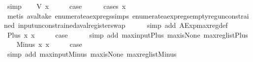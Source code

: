 \begin{isabellebody}
\ simp\isanewline
{}\isamarkupfalse%
\isanewline
\ \ \isamarkupfalse%
\ {\isacharparenleft}V\ x{\isacharparenright}\isanewline
\ \ \isamarkupfalse%
\ \isamarkupfalse%
\ {\isacharquery}case\isanewline
\ \ \ \ \isamarkupfalse%
\ {\isacharparenleft}cases\ x{\isacharparenright}\isanewline
\ \ \ \ \ \isamarkupfalse%
\ {\isacharparenleft}metis\ aval{\isacharunderscore}take\ enumerate{\isacharunderscore}aexp{\isacharunderscore}regs{\isachardot}simps{\isacharparenleft}{}{\isacharparenright}\ enumerate{\isacharunderscore}aexp{\isacharunderscore}regs{\isacharunderscore}empty{\isacharunderscore}reg{\isacharunderscore}unconstrained\ input{\isacharunderscore}unconstrained{\isacharunderscore}aval{\isacharunderscore}register{\isacharunderscore}swap{\isacharparenright}\isanewline
\ \ \ \ \isamarkupfalse%
\ {\isacharparenleft}simp\ add{\isacharcolon}\ AExp{\isachardot}max{\isacharunderscore}reg{\isacharunderscore}def{\isacharparenright}\isanewline
{}\isamarkupfalse%
\isanewline
\ \ \isamarkupfalse%
\ {\isacharparenleft}Plus\ x{}\ x{}{\isacharparenright}\isanewline
\ \ \isamarkupfalse%
\ \isamarkupfalse%
\ {\isacharquery}case\isanewline
\ \ \ \ \isamarkupfalse%
\ {\isacharparenleft}simp\ add{\isacharcolon}\ max{\isacharunderscore}input{\isacharunderscore}Plus\ max{\isacharunderscore}is{\isacharunderscore}None\ max{\isacharunderscore}reg{\isacharunderscore}list{\isacharunderscore}Plus{\isacharparenright}\isanewline
{}\isamarkupfalse%
\isanewline
\ \ \isamarkupfalse%
\ {\isacharparenleft}Minus\ x{}\ x{}{\isacharparenright}\isanewline
\ \ \isamarkupfalse%
\ \isamarkupfalse%
\ {\isacharquery}case\isanewline
\ \ \ \ \isamarkupfalse%
\ {\isacharparenleft}simp\ add{\isacharcolon}\ max{\isacharunderscore}input{\isacharunderscore}Minus\ max{\isacharunderscore}is{\isacharunderscore}None\ max{\isacharunderscore}reg{\isacharunderscore}list{\isacharunderscore}Minus{\isacharparenright}\isanewline
{}\isamarkupfalse%
%
\endisatagproof
{\isafoldproof}%
%
\isadelimproof
\isanewline
%
\endisadelimproof
%
\isadelimtheory
\isanewline
%
\endisadelimtheory
%
\isatagtheory
{}\isamarkupfalse%
%
\endisatagtheory
{\isafoldtheory}%
%
\isadelimtheory
%
\endisadelimtheory
%
\end{isabellebody}%
\endinput
